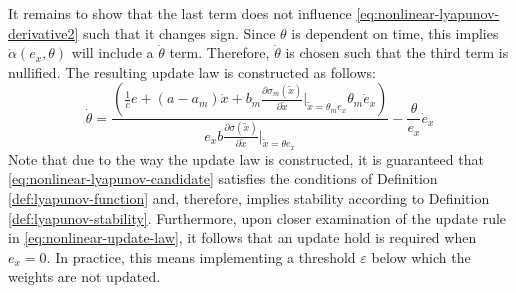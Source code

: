 It remains to show that the last term does not influence \eqref{eq:nonlinear-lyapunov-derivative2} such that it changes sign. Since $\theta$ is dependent on time, this implies $\dot \alpha(e_x, \theta)$ will include a $\dot \theta$ term. Therefore, $\dot \theta$ is chosen such that the third term is nullified. The resulting update law is constructed as follows:
\begin{equation}
    \dot \theta = \frac{(\frac{1}{c} e + (a-a_m)\dot x + b_m\frac{\partial \sigma_m(\tilde x)}{\partial \tilde x}\vert_{\tilde x=\theta_me_x}\theta_m \dot e_x) }{e_x b \frac{\partial \sigma(\tilde x)}{\partial \tilde x}\vert_{\tilde x=\theta e_x}} - \frac{\theta}{e_x}\dot e_x
   \label{eq:nonlinear-update-law}
\end{equation}
Note that due to the way the update law is constructed, it is guaranteed that \eqref{eq:nonlinear-lyapunov-candidate} satisfies the conditions of Definition \ref{def:lyapunov-function} and, therefore, implies stability according to Definition \ref{def:lyapunov-stability}. Furthermore, upon closer examination of the update rule in \eqref{eq:nonlinear-update-law}, it follows that an update hold is required when $e_x=0$. In practice, this means implementing a threshold $\varepsilon$ below which the weights are not updated.